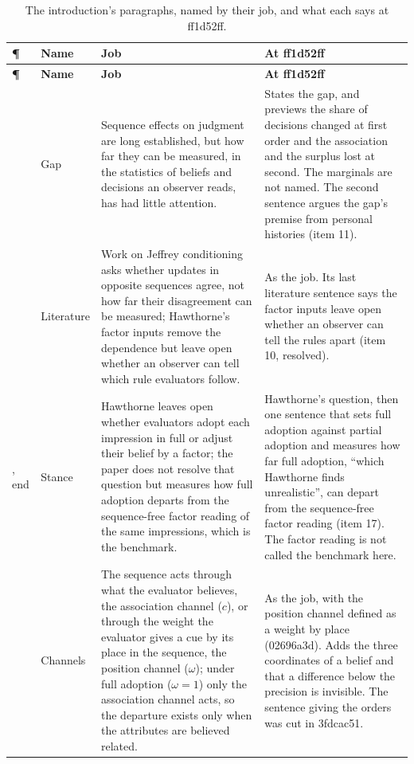 \documentclass[11pt,a4paper]{article}
\begin{document}
\small
\begin{longtable}{@{}p{0.7cm}p{1.6cm}p{6.5cm}p{6.5cm}@{}}
\caption{The introduction's paragraphs, named by their job, and what each says at ff1d52ff.}\label{tab:names}\\
\toprule
\textbf{\P} & \textbf{Name} & \textbf{Job} & \textbf{At ff1d52ff}\\
\midrule
\endfirsthead
\toprule
\textbf{\P} & \textbf{Name} & \textbf{Job} & \textbf{At ff1d52ff}\\
\midrule
\endhead
\bottomrule
\endfoot
1 & Gap & Sequence effects on judgment are long established, but how far they can be measured, in the statistics of beliefs and decisions an observer reads, has had little attention.
  & States the gap, and previews the share of decisions changed at first order and the association and the surplus lost at second. The marginals are not named. The second sentence argues the gap's premise from personal histories (item 11).\\
\addlinespace
2 & Literature & Work on Jeffrey conditioning asks whether updates in opposite sequences agree, not how far their disagreement can be measured; Hawthorne's factor inputs remove the dependence but leave open whether an observer can tell which rule evaluators follow.
  & As the job. Its last literature sentence says the factor inputs leave open whether an observer can tell the rules apart (item 10, resolved).\\
\addlinespace
2, end & Stance & Hawthorne leaves open whether evaluators adopt each impression in full or adjust their belief by a factor; the paper does not resolve that question but measures how full adoption departs from the sequence-free factor reading of the same impressions, which is the benchmark.
  & Hawthorne's question, then one sentence that sets full adoption against partial adoption and measures how far full adoption, ``which Hawthorne finds unrealistic'', can depart from the sequence-free factor reading (item 17). The factor reading is not called the benchmark here.\\
\addlinespace
3 & Channels & The sequence acts through what the evaluator believes, the association channel ($c$), or through the weight the evaluator gives a cue by its place in the sequence, the position channel ($\omega$); under full adoption ($\omega=1$) only the association channel acts, so the departure exists only when the attributes are believed related.
  & As the job, with the position channel defined as a weight by place (02696a3d). Adds the three coordinates of a belief and that a difference below the precision is invisible. The sentence giving the orders was cut in 3fdcac51.\\

\end{longtable}
\end{document}
